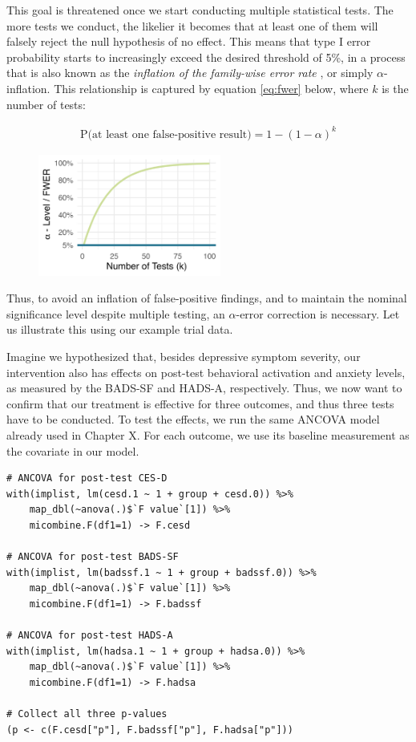 This goal is threatened once we start conducting multiple statistical tests. The more tests we conduct, the likelier it becomes that at least one of them will falsely reject the null hypothesis of no effect. This means that type I error probability starts to increasingly exceed the desired threshold of 5\%, in a process that is also known as the \emph{inflation of the family-wise error rate} \citep[FWER;][]{vickerstaff2019methods}, or simply $\alpha$-inflation. This relationship is captured by equation \ref{eq:fwer} below, where $k$ is the number of tests:

\begin{align}
\label{eq:fwer}
\text{P(at least one false-positive result)} = 1-(1-\alpha)^{k}
\end{align}

\begin{figure}[H]
\includegraphics[width=6cm]{images/fwer2.png}
\centering
\end{figure}

Thus, to avoid an inflation of false-positive findings, and to maintain the nominal significance level despite multiple testing, an $\alpha$-error correction is necessary. Let us illustrate this using our example trial data.

Imagine  we hypothesized that, besides depressive symptom severity, our intervention also has effects on post-test behavioral activation and anxiety levels, as measured by the BADS-SF and HADS-A, respectively. Thus, we now want to confirm that our treatment is effective for three outcomes, and thus three tests have to be conducted. To test the effects, we run the same ANCOVA model already used in Chapter X. For each outcome, we use its baseline measurement as the covariate in our model. 

\begin{lstlisting}
# ANCOVA for post-test CES-D
with(implist, lm(cesd.1 ~ 1 + group + cesd.0)) %>%
    map_dbl(~anova(.)$`F value`[1]) %>%
    micombine.F(df1=1) -> F.cesd

# ANCOVA for post-test BADS-SF
with(implist, lm(badssf.1 ~ 1 + group + badssf.0)) %>%
    map_dbl(~anova(.)$`F value`[1]) %>%
    micombine.F(df1=1) -> F.badssf

# ANCOVA for post-test HADS-A
with(implist, lm(hadsa.1 ~ 1 + group + hadsa.0)) %>%
    map_dbl(~anova(.)$`F value`[1]) %>%
    micombine.F(df1=1) -> F.hadsa

# Collect all three p-values
(p <- c(F.cesd["p"], F.badssf["p"], F.hadsa["p"]))
\end{lstlisting}

